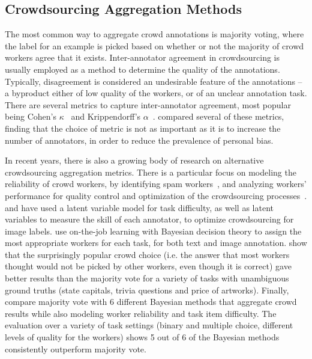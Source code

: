 \subsection{Crowdsourcing Aggregation Methods}
\label{sec:rel-work-agg}

The most common way to aggregate crowd annotations is majority voting, where the label for an example is picked based on whether or not the majority of crowd workers agree that it exists. Inter-annotator agreement in crowdsourcing is usually employed as a method to determine the quality of the annotations. Typically, disagreement is considered an undesirable feature of the annotations -- a byproduct either of low quality of the workers, or of an unclear annotation task. There are several metrics to capture inter-annotator agreement, most popular being Cohen's $\kappa$~\cite{cohen1960kappa} and Krippendorff's $\alpha$~\cite{klaus2013content}. \citet{artstein2008inter} compared several of these metrics, finding that the choice of metric is not as important as it is to increase the number of annotators, in order to reduce the prevalence of personal bias.

In recent years, there is also a growing body of research on alternative crowdsourcing aggregation metrics. There is a particular focus on modeling the reliability of crowd workers, by identifying spam workers~\cite{Bozzon:2013,Kittur2008,Ipeirotis:2010}, and analyzing workers' performance for quality control and optimization of the crowdsourcing processes~\cite{Singer:2013}. \citet{NIPS2009_3644} and \citet{welinder2010multidimensional} have used a latent variable model for task difficulty, as well as latent variables to measure the skill of each annotator, to optimize crowdsourcing for image labels. \citet{werling2015job} use on-the-job learning with Bayesian decision theory to assign the most appropriate workers for each task, for both text and image annotation. \citet{prelec2017solution} show that the surprisingly popular crowd choice (i.e. the answer that most workers thought would not be picked by other workers, even though it is correct) gave better results than the majority vote for a variety of tasks with unambiguous ground truths (state capitals, trivia questions and price of artworks). Finally, \citet{paun2018comparing} compare majority vote with 6 different Bayesian methods that aggregate crowd results while also modeling worker reliability and task item difficulty. The evaluation over a variety of task settings (binary and multiple choice, different levels of quality for the workers) shows 5 out of 6 of the Bayesian methods consistently outperform majority vote.

